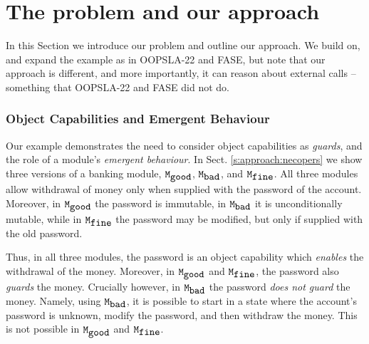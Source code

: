

\section{The problem and our approach}
\label{s:outline}
 
In this Section we introduce our problem and outline our approach.
 We build on, and expand the  example as in OOPSLA-22 and FASE,  but {note that our approach is different, and more importantly, it can reason about external calls -- something that OOPSLA-22 and FASE did not do.}%
 
  \subsubsection{Object Capabilities and Emergent Behaviour} %
\label{s:bank}
Our example  demonstrates the need to consider object capabilities as \emph{guards}, and the role
of a {module}'s \emph{emergent behaviour}. 
%
In Sect.  \ref{s:approach:necopers} we show three versions of a banking module, $\ModA$, $\ModB$, and $\ModC$. 
All three modules allow withdrawal of  money only when supplied with the password of the account.
Moreover, in $\ModA$ the password is immutable, in $\ModB$ it is unconditionally mutable, while in $\ModC$ the password may be modified, but only if supplied with the old password. 


{Thus, in all three modules, the password is an object capability which \emph{enables} the withdrawal of the money. 
Moreover, in $\ModA$ and $\ModC$, the password also \emph{guards} the money.
Crucially however,  in $\ModB$ the password \emph{does not guard} the money. 
 Namely, using $\ModB$, it is possible to start in a state where the account's password is unknown, modify the password, and then withdraw the money. 
 This is not possible  in $\ModA$ and $\ModC$.
}

